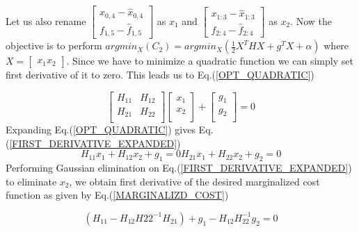 Let us also rename $\begin{bmatrix} x_{0, 4} - \hat x_{0, 4} \\ f_{1, 5} - \hat f_{1, 5} \end{bmatrix}$ as $x_1$ and $\begin{bmatrix} x_{1:3} - \hat x_{1:3} \\ f_{2:4} - \hat f_{2:4} \end{bmatrix}$ as $x_2$. Now the objective is to perform $argmin_X(C_2) = argmin_X(\frac{1}{2}X^THX + g^TX + \alpha)$ where $X = \begin{bmatrix} x_1 x_2 \end{bmatrix}$. Since we have to minimize a quadratic function we can simply set first derivative of it to zero. This leads us to Eq.(\ref{OPT_QUADRATIC})

\begin{equation}
	\begin{bmatrix} 
				H_{11} & H_{12} \\
				H_{21} & H_{22} \\
	\end{bmatrix}
	\begin{bmatrix} 
				x_{1} \\
				x_{2} \\
	\end{bmatrix} + 
	\begin{bmatrix} 
				g_{1} \\
				g_{2} \\
	\end{bmatrix} = 0
	\label{OPT_QUADRATIC}
\end{equation}
Expanding Eq.(\ref{OPT_QUADRATIC}) gives Eq.(\ref{FIRST_DERIVATIVE_EXPANDED})
\begin{subequations}
	\begin{equation}
		H_{11}x_1 + H_{12}x_2 + g_1 = 0
	\end{equation}
	\begin{equation}
		H_{21}x_1 + H_{22}x_2 + g_2 = 0
	\end{equation}
\label{FIRST_DERIVATIVE_EXPANDED}
\end{subequations}
Performing Gaussian elimination on Eq.(\ref{FIRST_DERIVATIVE_EXPANDED}) to eliminate $x_2$, we obtain first derivative of the desired marginalized cost function as given by Eq.(\ref{MARGINALIZD_COST})

\begin{equation}
	\left(H_{11} - H_{12}H{22}^{-1}H_{21}\right) + g_1 - H_{12}H_{22}^{-1}g_2 = 0
\label{MARGINALIZD_COST}
\end{equation}

